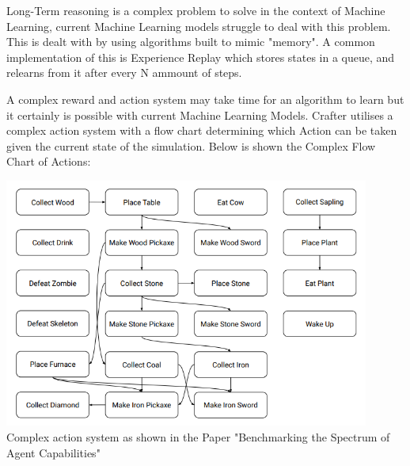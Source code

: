 \begin{flushleft}
                            \vspace{0.2cm}

                            Long-Term reasoning is a complex problem to solve in the context of Machine Learning, current Machine Learning models
                            struggle to deal with this problem. This is dealt with by using algorithms built to mimic "memory". A common 
                            implementation of this is Experience Replay which stores states in a queue, and relearns from it after every N ammount
                            of steps. \\

                            \vspace{0.2cm}

                            A complex reward and action system may take time for an algorithm to learn but it certainly is possible with current
                            Machine Learning Models. Crafter utilises a complex action system with a flow chart determining which Action can be taken
                            given the current state of the simulation. Below is shown the Complex Flow Chart of Actions: \\

                            \vspace{0.2cm}
                            \begin{center}
                                \includegraphics[width=12cm]{Images/InitialResearch/CrafterComplexActionSystem.PNG} \\
                                Complex action system as shown in the Paper "Benchmarking the Spectrum of Agent Capabilities" \\
                            \end{center}
                            \vspace{0.2cm}


\end{flushleft}
